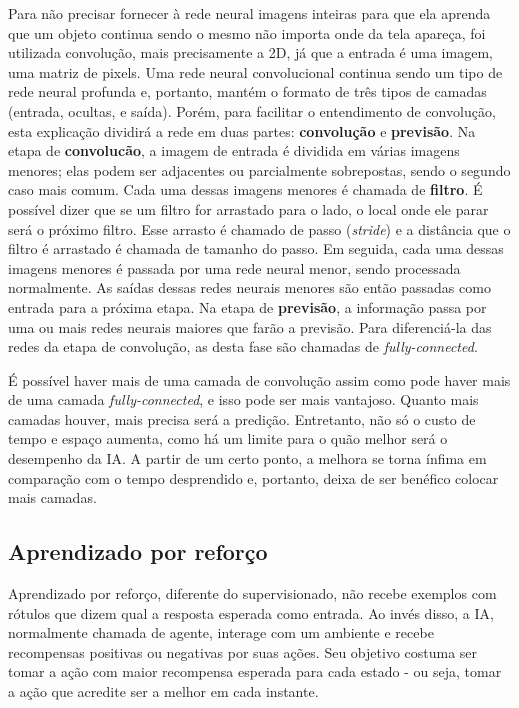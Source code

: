 Para não precisar fornecer à rede neural imagens inteiras para que ela aprenda que um objeto continua sendo o mesmo não importa onde da tela apareça, foi utilizada convolução, mais precisamente a 2D, já que a entrada é uma imagem, uma matriz de pixels.
Uma rede neural convolucional continua sendo um tipo de rede neural profunda e, portanto, mantém o formato de três tipos de camadas (entrada, ocultas, e saída). Porém, para facilitar o entendimento de convolução, esta explicação dividirá a rede em duas partes: \textbf{convolução} e \textbf{previsão}.
Na etapa de \textbf{convolucão}, a imagem de entrada é dividida em várias imagens menores; elas podem ser adjacentes ou parcialmente sobrepostas, sendo o segundo caso mais comum. Cada uma dessas imagens menores é chamada de \textbf{filtro}. É possível dizer que se um filtro for arrastado para o lado, o local onde ele parar será o próximo filtro. Esse arrasto é chamado de passo (\textit{stride}) e a distância que o filtro é arrastado é chamada de tamanho do passo. Em seguida, cada uma dessas imagens menores é passada por uma rede neural menor, sendo processada normalmente. As saídas dessas redes neurais menores são então passadas como entrada para a próxima etapa.
Na etapa de \textbf{previsão}, a informação passa por uma ou mais redes neurais maiores que farão a previsão. Para diferenciá-la das redes da etapa de convolução, as desta fase são chamadas de \textit{fully-connected}.

É possível haver mais de uma camada de convolução assim como pode haver mais de uma camada \textit{fully-connected}, e isso pode ser mais vantajoso. Quanto mais camadas houver, mais precisa será a predição. Entretanto, não só o custo de tempo e espaço aumenta, como há um limite para o quão melhor será o desempenho da IA. A partir de um certo ponto, a melhora se torna ínfima em comparação com o tempo desprendido e, portanto, deixa de ser benéfico colocar mais camadas.

\subsection{Aprendizado por reforço}
\label{sec:rl}

Aprendizado por reforço, diferente do supervisionado, não recebe exemplos com rótulos que dizem qual a resposta esperada como entrada. Ao invés disso, a IA, normalmente chamada de agente, interage com um ambiente e recebe recompensas positivas ou negativas por suas ações. Seu objetivo costuma ser tomar a ação com maior recompensa esperada para cada estado - ou seja, tomar a ação que acredite ser a melhor em cada instante.

